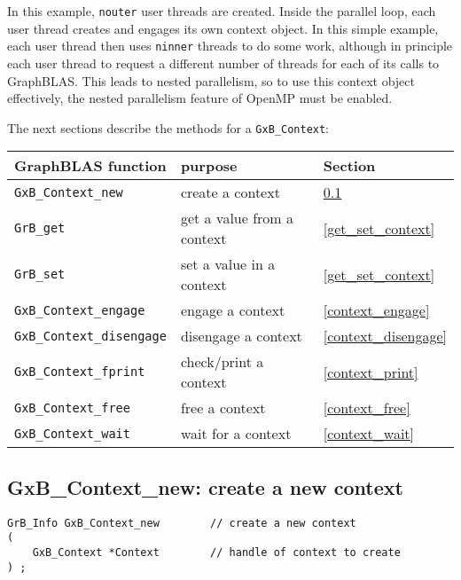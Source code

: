 \documentclass[12pt]{article}
\begin{document}
In this example, \verb'nouter' user threads are created.  Inside the parallel
loop, each user thread creates and engages its own context object.  In this
simple example, each user thread then uses \verb'ninner' threads to do some
work, although in principle each user thread to request a different number of
threads for each of its calls to GraphBLAS.  This leads to nested parallelism,
so to use this context object effectively, the nested parallelism feature of
OpenMP must be enabled.

The next sections describe the methods for a \verb'GxB_Context':

\vspace{0.2in}
{\footnotesize
\begin{tabular}{lll}
\hline
GraphBLAS function   & purpose                                      & Section \\
\hline
\verb'GxB_Context_new'           & create a context                     & \ref{context_new} \\
\verb'GrB_get'                   & get a value from a context           & \ref{get_set_context} \\
\verb'GrB_set'                   & set a value in a context             & \ref{get_set_context} \\
\verb'GxB_Context_engage'        & engage a context                     & \ref{context_engage} \\
\verb'GxB_Context_disengage'     & disengage a context                  & \ref{context_disengage} \\
\verb'GxB_Context_fprint'        & check/print a context                & \ref{context_print} \\
\verb'GxB_Context_free'          & free a context                       & \ref{context_free} \\
\verb'GxB_Context_wait'          & wait for a context                   & \ref{context_wait} \\
\hline
\end{tabular}
}

\subsection{{\sf GxB\_Context\_new:}  create a new context}
\label{context_new}

\begin{mdframed}[userdefinedwidth=6in]
{\footnotesize
\begin{verbatim}
GrB_Info GxB_Context_new        // create a new context
(
    GxB_Context *Context        // handle of context to create
) ;
\end{verbatim} } \end{mdframed}
\end{document}
